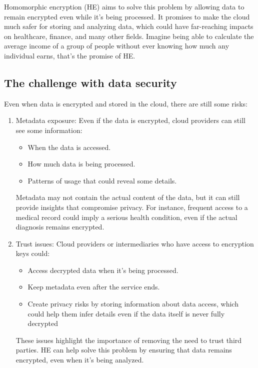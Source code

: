 \documentclass[
  letterpaper,
  DIV=11,
  numbers=noendperiod,
  oneside]{scrartcl}
\providecommand{\tightlist}{%
  \setlength{\itemsep}{0pt}\setlength{\parskip}{0pt}}\usepackage{longtable,booktabs,array}
\begin{document}
Homomorphic encryption (HE) aims to solve this problem by allowing data
to remain encrypted even while it's being processed. It promises to make
the cloud much safer for storing and analyzing data, which could have
far-reaching impacts on healthcare, finance, and many other fields.
Imagine being able to calculate the average income of a group of people
without ever knowing how much any individual earns, that's the promise
of HE.

\subsection{The challenge with data
security}\label{the-challenge-with-data-security}

Even when data is encrypted and stored in the cloud, there are still
some risks:

\begin{enumerate}
\def\labelenumi{\arabic{enumi}.}
\item
  Metadata exposure: Even if the data is encrypted, cloud providers can
  still see some information:

  \begin{itemize}
  \tightlist
  \item
    When the data is accessed.
  \item
    How much data is being processed.
  \item
    Patterns of usage that could reveal some details.
  \end{itemize}

  Metadata may not contain the actual content of the data, but it can
  still provide insights that compromise privacy. For instance, frequent
  access to a medical record could imply a serious health condition,
  even if the actual diagnosis remains encrypted.
\item
  Trust issues: Cloud providers or intermediaries who have access to
  encryption keys could:

  \begin{itemize}
  \tightlist
  \item
    Access decrypted data when it's being processed.
  \item
    Keep metadata even after the service ends.
  \item
    Create privacy risks by storing information about data access, which
    could help them infer details even if the data itself is never fully
    decrypted
  \end{itemize}

  These issues highlight the importance of removing the need to trust
  third parties. HE can help solve this problem by ensuring that data
  remains encrypted, even when it's being analyzed.
\end{enumerate}
\end{document}
